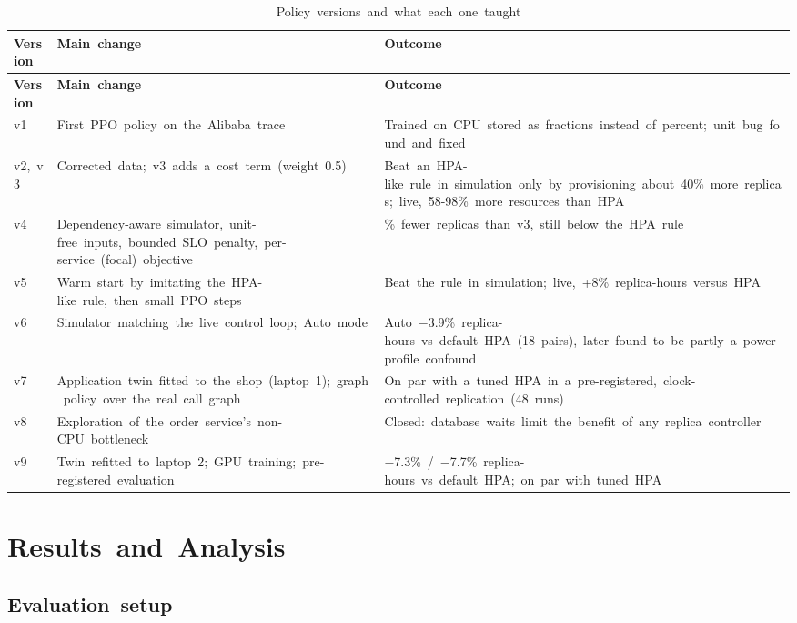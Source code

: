 \documentclass[12pt,a4paper,oneside]{report}
\begin{document}
\begingroup\small\setlength{\tabcolsep}{4pt}\renewcommand{\arraystretch}{1.25}
\begin{longtable}{|>{\raggedright\arraybackslash}p{1.45cm}|>{\raggedright\arraybackslash}p{6.11cm}|>{\raggedright\arraybackslash}p{6.98cm}|}
\caption{Policy~versions~and~what~each~one~taught}\label{tab:versions}\\\hline
\textbf{Version} & \textbf{Main~change} & \textbf{Outcome}\\\hline\endfirsthead
\hline \textbf{Version} & \textbf{Main~change} & \textbf{Outcome}\\\hline\endhead
v1 & First~PPO~policy~on~the~Alibaba~trace & Trained~on~CPU~stored~as~fractions~instead~of~percent;~unit~bug~found~and~fixed\\\hline
v2,~v3 & Corrected~data;~v3~adds~a~cost~term~(weight~0.5) & Beat~an~HPA-like~rule~in~simulation~only~by~provisioning~about~40\%~more~replicas;~live,~58-98\%~more~resources~than~HPA\\\hline
v4 & Dependency-aware~simulator,~unit-free~inputs,~bounded~SLO~penalty,~per-service~(focal)~objective & 52\%~fewer~replicas~than~v3,~still~below~the~HPA~rule\\\hline
v5 & Warm~start~by~imitating~the~HPA-like~rule,~then~small~PPO~steps & Beat~the~rule~in~simulation;~live,~+8\%~replica-hours~versus~HPA\\\hline
v6 & Simulator~matching~the~live~control~loop;~Auto~mode & Auto~$-$3.9\%~replica-hours~vs~default~HPA~(18~pairs),~later~found~to~be~partly~a~power-profile~confound\\\hline
v7 & Application~twin~fitted~to~the~shop~(laptop~1);~graph~policy~over~the~real~call~graph & On~par~with~a~tuned~HPA~in~a~pre-registered,~clock-controlled~replication~(48~runs)\\\hline
v8 & Exploration~of~the~order~service's~non-CPU~bottleneck & Closed:~database~waits~limit~the~benefit~of~any~replica~controller\\\hline
v9 & Twin~refitted~to~laptop~2;~GPU~training;~pre-registered~evaluation & $-$7.3\%~/~$-$7.7\%~replica-hours~vs~default~HPA;~on~par~with~tuned~HPA\\\hline
\end{longtable}\endgroup

\clearpage
\chapter{Results~and~Analysis}\label{chap:results}

\section{Evaluation~setup}
\end{document}
